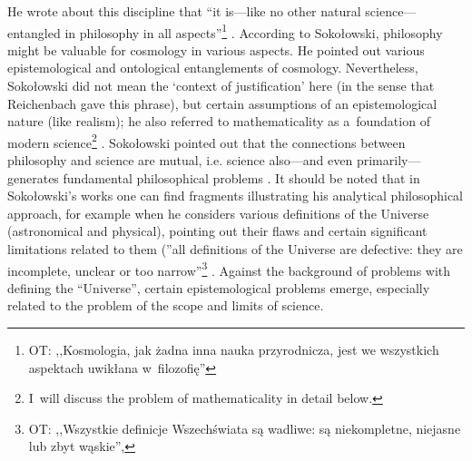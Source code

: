 \documentclass[%
  manuscript=article,
  year=2024,
  volume=77,
  doi=00000.000,
]{zfn}
\begin{document}
He wrote about this discipline that ``it is---like no other natural science---entangled in philosophy in all aspects''\footnote{OT: ,,Kosmologia, jak żadna inna nauka przyrodnicza, jest we wszystkich aspektach uwikłana w~filozofię''} 
\parencite[][p.226]{}. %
 According to Sokołowski, philosophy might be valuable for cosmology in various aspects. He pointed out various epistemological and ontological entanglements of cosmology. Nevertheless, Sokołowski did not mean the ‘context of justification' here (in the sense that Reichenbach gave this phrase), but certain assumptions of an epistemological nature (like realism); he also referred to mathematicality as a~foundation of modern science\footnote{I~will discuss the problem of mathematicality in detail below. } 
\parencite[][p.181]{}. %
 Sokołowski pointed out that the connections between philosophy and science are mutual, i.e. science also---and even primarily---generates fundamental philosophical problems 
\parencite[][p.56]{}. %
 It should be noted that in Sokołowski's works one can find fragments illustrating his analytical philosophical approach, for example when he considers various definitions of the Universe (astronomical and physical), pointing out their flaws and certain significant limitations related to them (''all definitions of the Universe are defective: they are incomplete, unclear or too narrow''\footnote{OT: ,,Wszystkie definicje Wszechświata są wadliwe: są niekompletne, niejasne lub zbyt wąskie'',} 
\parencite[][p.235]{}. %
 Against the background of problems with defining the ``Universe'', certain epistemological problems emerge, especially related to the problem of the scope and limits of science.
\end{document}
